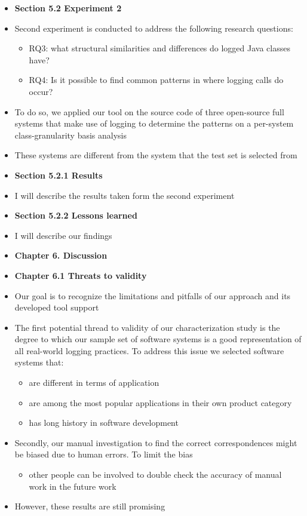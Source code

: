 \documentclass{article}
\newcommand{\bold}{\textbf}
\newcommand{\tsc}{\textsc}
\begin{document}
\begin{itemize} [leftmargin=.1in]
\item \bold{Section 5.2 Experiment 2}
\item Second experiment is conducted to address the following research questions:
\begin{itemize}
\item \tsc{RQ3: }what structural similarities and differences do logged Java classes have?
\item \tsc{RQ4: }Is it possible to find common patterns in where logging calls do occur?
\end{itemize}
\item To do so, we applied our tool on the source code of three open-source full systems that make use of logging to determine the patterns on a per-system class-granularity basis analysis
\item These systems are different from the system that the test set is selected from
\item \bold{Section 5.2.1 Results}
\item I will describe the results taken form the second experiment
\item \bold{Section 5.2.2 Lessons learned}
\item I will describe our findings

\item \bold{Chapter 6. Discussion}
\item \bold{Chapter 6.1 Threats to validity}
\item Our goal is to recognize the limitations and pitfalls of our approach and its developed tool support
\item The first potential thread to validity of our characterization study is the degree to which our sample set of software systems is a good representation of all real-world logging practices. To address this issue we selected software systems that:
\begin{itemize}
\item are different in terms of application
\item are among the most popular applications in their own product category
\item has long history in software development
\end{itemize}
\item Secondly, our manual investigation to find the correct correspondences might be biased due to human errors. To limit the bias
\begin{itemize} \item other people can be involved to double check the accuracy of manual work in the future work\end{itemize}
\item However, these results are still promising


\end{itemize}
\end{document}
